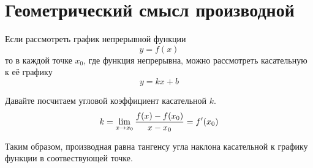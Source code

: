 \section{Геометрический смысл производной}

Если рассмотреть график непрерывной функции 
$$y = f(x)$$
то в каждой точке $x_0$, где функция непрерывна, можно рассмотреть касательную к её графику
$$y = kx + b$$

\begin{center}
\def\svgwidth{6.0cm}

\end{center}

Давайте посчитаем угловой коэффициент касательной $k$.
$$k = \lim_{x\rightarrow x_0} \frac{f(x) - f(x_0)}{x - x_0} = f'(x_0)$$

Таким образом, производная равна тангенсу угла наклона касательной к графику функции в соотвествующей точке.

